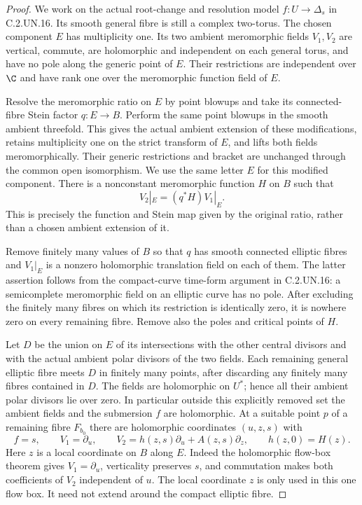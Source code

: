 \begin{proof}
We work on the actual root-change and resolution model
$f:U\to\Delta_s$ in C.2.UN.16. Its smooth general fibre
is still a complex two-torus. The chosen component $E$
has multiplicity one. Its two ambient meromorphic fields
$V_1,V_2$ are vertical, commute, are holomorphic and
independent on each general torus, and have no pole along
the generic point of $E$. Their restrictions are independent
over $\C$ and have rank one over the meromorphic function
field of $E$.

Resolve the meromorphic ratio on $E$ by point blowups
and take its connected-fibre Stein factor $q:E\to B$.
Perform the same point blowups in the smooth ambient
threefold. This gives the actual ambient extension of
these modifications, retains multiplicity one on the
strict transform of $E$, and lifts both fields
meromorphically. Their generic restrictions and bracket
are unchanged through the common open isomorphism.
We use the same letter $E$ for this modified component.
There is a nonconstant meromorphic function $H$ on $B$
such that
\[
                    V_2|_E=(q^*H)V_1|_E.
                                                               \tag{C.RG.3}
\]
This is precisely the function and Stein map given by
the original ratio, rather than a chosen ambient extension
of it.

Remove finitely many values of $B$ so that $q$ has smooth
connected elliptic fibres and $V_1|_E$ is a nonzero
holomorphic translation field on each of them. The latter
assertion follows from the compact-curve time-form argument
in C.2.UN.16: a semicomplete meromorphic field on an
elliptic curve has no pole. After excluding the finitely
many fibres on which its restriction is identically zero,
it is nowhere zero on every remaining fibre. Remove also
the poles and critical points of $H$.

Let $D$ be the union on $E$ of its intersections with
the other central divisors and with the actual ambient
polar divisors of the two fields. Each remaining general
elliptic fibre meets $D$ in finitely many points, after
discarding any finitely many fibres contained in $D$.
The fields are holomorphic on $U^*$; hence all their
ambient polar divisors lie over zero. In particular
outside this explicitly removed set the ambient fields
and the submersion $f$ are holomorphic. At a suitable
point $p$ of a remaining fibre $F_{b_0}$ there are
holomorphic coordinates $(u,z,s)$ with
\[
 f=s,\qquad V_1=\partial_u,\qquad
 V_2=h(z,s)\partial_u+A(z,s)\partial_z,
 \qquad h(z,0)=H(z).
                                                               \tag{C.RG.4}
\]
Here $z$ is a local coordinate on $B$ along $E$.
Indeed the holomorphic flow-box theorem gives $V_1=\partial_u$,
verticality preserves $s$, and commutation makes both
coefficients of $V_2$ independent of $u$. The local coordinate
$z$ is only used in this one flow box. It need not extend
around the compact elliptic fibre.


\end{proof}
